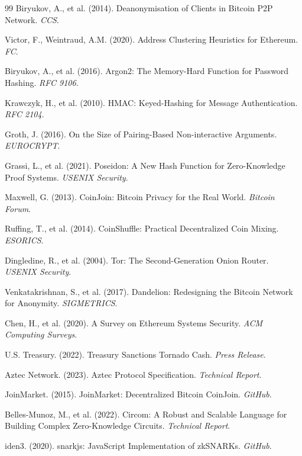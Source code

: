 \documentclass[11pt]{article}
\theoremstyle{definition}
\theoremstyle{plain}
\theoremstyle{remark}
\begin{document}
\begin{thebibliography}{99}
Biryukov, A., et al. (2014). Deanonymisation of Clients in Bitcoin P2P Network. \textit{CCS}.

Victor, F., Weintraud, A.M. (2020). Address Clustering Heuristics for Ethereum. \textit{FC}.

Biryukov, A., et al. (2016). Argon2: The Memory-Hard Function for Password Hashing. \textit{RFC 9106}.

Krawczyk, H., et al. (2010). HMAC: Keyed-Hashing for Message Authentication. \textit{RFC 2104}.

Groth, J. (2016). On the Size of Pairing-Based Non-interactive Arguments. \textit{EUROCRYPT}.

Grassi, L., et al. (2021). Poseidon: A New Hash Function for Zero-Knowledge Proof Systems. \textit{USENIX Security}.

Maxwell, G. (2013). CoinJoin: Bitcoin Privacy for the Real World. \textit{Bitcoin Forum}.

Ruffing, T., et al. (2014). CoinShuffle: Practical Decentralized Coin Mixing. \textit{ESORICS}.

Dingledine, R., et al. (2004). Tor: The Second-Generation Onion Router. \textit{USENIX Security}.

Venkatakrishnan, S., et al. (2017). Dandelion: Redesigning the Bitcoin Network for Anonymity. \textit{SIGMETRICS}.

Chen, H., et al. (2020). A Survey on Ethereum Systems Security. \textit{ACM Computing Surveys}.

U.S. Treasury. (2022). Treasury Sanctions Tornado Cash. \textit{Press Release}.

Aztec Network. (2023). Aztec Protocol Specification. \textit{Technical Report}.

JoinMarket. (2015). JoinMarket: Decentralized Bitcoin CoinJoin. \textit{GitHub}.

Belles-Munoz, M., et al. (2022). Circom: A Robust and Scalable Language for Building Complex Zero-Knowledge Circuits. \textit{Technical Report}.

iden3. (2020). snarkjs: JavaScript Implementation of zkSNARKs. \textit{GitHub}.

\end{thebibliography}
\end{document}
